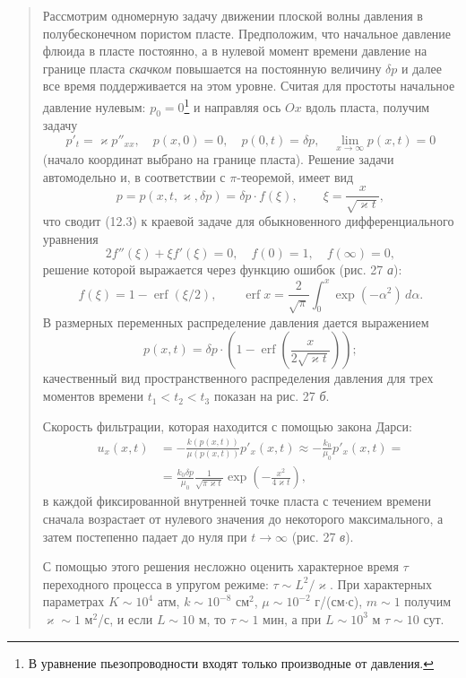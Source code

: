\documentclass[12pt,a4paper]{article}
\begin{document}
\begin{quote}\sloppy
Рассмотрим одномерную задачу движении плоской волны давления в полубесконечном пористом пласте. Предположим, что начальное давление флюида в пласте постоянно, а в нулевой момент времени давление на границе пласта \textit{скачком} повышается на постоянную величину $\delta p$ и далее все время поддерживается на этом уровне. Считая для простоты начальное давление нулевым: $p_0=0$\footnote{В уравнение пьезопроводности входят только производные от давления.} и направляя ось $Ox$ вдоль пласта, получим задачу
\begin{equation}
p'_t=\varkappa p''_{xx},\quad p(x,0)=0,\quad p(0,t)=\delta p,\quad \lim_{x\to\infty}p(x,t)=0\tag{12.3}\label{q8:eq-12-3}
\end{equation}
(начало координат выбрано на границе пласта). Решение задачи автомодельно и, в соответствии с $\pi$-теоремой, имеет вид
\[
p=p(x,t,\varkappa,\delta p)=\delta p\cdot f(\xi),\qquad \xi=\frac{x}{\sqrt{\varkappa t}},
\]
что сводит (12.3) к краевой задаче для обыкновенного дифференциального уравнения
\[
2f''(\xi)+\xi f'(\xi)=0,\quad f(0)=1,\quad f(\infty)=0,
\]
решение которой выражается через функцию ошибок (рис. 27 \textit{а}):
\[
f(\xi)=1-\operatorname{erf}(\xi/2),\qquad \operatorname{erf}x=\frac{2}{\sqrt\pi}\int_0^x\exp(-\alpha^2)\,d\alpha.
\]
В размерных переменных распределение давления дается выражением
\[
p(x,t)=\delta p\cdot\left(1-\operatorname{erf}\left(\frac{x}{2\sqrt{\varkappa t}}\right)\right);
\]
качественный вид пространственного распределения давления для трех моментов времени $t_1<t_2<t_3$ показан на рис. 27 \textit{б}.


Скорость фильтрации, которая находится с помощью закона Дарси:
\[\begin{aligned}
u_x(x,t)&=-\frac{k(p(x,t))}{\mu(p(x,t))}p'_x(x,t)\approx-\frac{k_0}{\mu_0}p'_x(x,t)=\\
&=\frac{k_0\delta p}{\mu_0}\frac{1}{\sqrt{\pi\varkappa t}}\exp\left(-\frac{x^2}{4\varkappa t}\right),
\end{aligned}\]
в каждой фиксированной внутренней точке пласта с течением времени сначала возрастает от нулевого значения до некоторого максимального, а затем постепенно падает до нуля при $t\to\infty$ (рис. 27 \textit{в}).

С помощью этого решения несложно оценить характерное время $\tau$ переходного процесса в упругом режиме: $\tau\sim L^2/\varkappa$. При характерных параметрах $K\sim10^4$ атм, $k\sim10^{-8}$ см$^2$, $\mu\sim10^{-2}$ г/(см$\cdot$с), $m\sim1$ получим $\varkappa\sim1$ м$^2$/с, и если $L\sim10$ м, то $\tau\sim1$ мин, а при $L\sim10^3$ м $\tau\sim10$ сут.
\par\nobreak{}\par
\end{quote}
\end{document}
